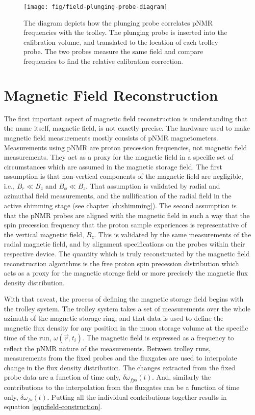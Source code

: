 \begin{figure}
\label{fig:field-plunging-probe-diagram}
\texttt{[image: fig/field-plunging-probe-diagram]}
\caption{The diagram depicts how the plunging probe correlates pNMR frequencies with the trolley.  The plunging probe is inserted into the calibration volume, and translated to the location of each trolley probe.  The two probes measure the same field and compare frequencies to find the relative calibration correction.}
\end{figure}

\section{Magnetic Field Reconstruction}
The first important aspect of magnetic field reconstruction is understanding that the name itself, magnetic field, is not exactly precise.  The hardware used to make magnetic field measurements mostly consists of pNMR magnetometers.  Measurements using pNMR are proton precession frequencies, not magnetic field measurements.  They act as a proxy for the magnetic field in a specific set of circumstances which are assumed in the \mugmtwo magnetic storage field.  The first assumption is that non-vertical components of the magnetic field are negligible, i.e., $B_r \ll B_z$ and $B_\phi \ll B_z$.  That assumption is validated by radial and azimuthal field measurements, and the nullification of the radial field in the active shimming stage (see chapter \ref{ch:shimming}).  The second assumption is that the pNMR probes are aligned with the magnetic field in such a way that the spin precession frequency that the proton sample experiences is representative of the vertical magnetic field, $B_z$.  This is validated by the same measurements of the radial magnetic field, and by alignment specifications on the probes within their respective device.  The quantity which is truly reconstructed by the magnetic field reconstruction algorithms is the free proton spin precession distribution which acts as a proxy for the magnetic storage field or more precisely the magnetic flux density distribution.

With that caveat, the process of defining the \gmtwo magnetic storage field begins with the trolley system.  The trolley system takes a set of measurements over the whole azimuth of the magnetic storage ring, and that data is used to define the magnetic flux density for any position in the muon storage volume at the specific time of the run, $\omega(\vec{r}, t_i)$. The magnetic field is expressed as a frequency to reflect the pNMR nature of the measurements.  Between trolley runs, measurements from the fixed probes and the fluxgates are used to interpolate change in the flux density distribution.  The changes extracted from the fixed probe data are a function of time only, $\delta \omega_{fps}(t)$.  And, similarly the contributions to the interpolation from the fluxgates can be a function of time only, $\delta \omega_{fs}(t)$.  Putting all the individual contributions together results in equation \ref{eqn:field-construction}.

